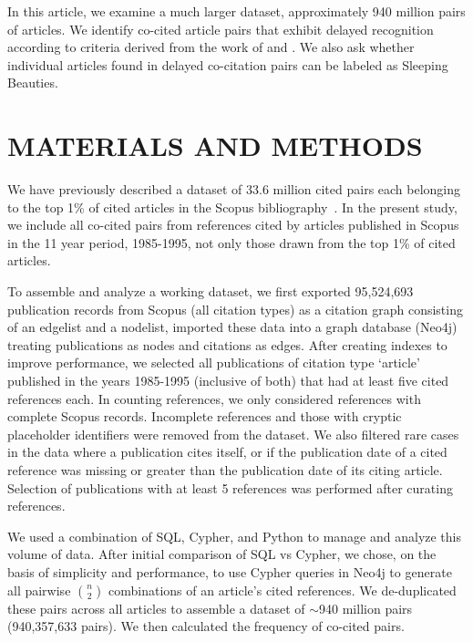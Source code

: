 \documentclass[utf8]{frontiersSCNS}
\begin{document}
In this article, we examine a much larger dataset, approximately 940 million pairs of articles. We identify co-cited article pairs that exhibit delayed recognition according to criteria derived from the work of  \cite{Raan2004,Raan2019} and  \cite{Ke2015}. We also ask whether individual articles found in delayed co-citation pairs can be labeled as Sleeping Beauties. 


\section{MATERIALS AND METHODS}

We have previously described a dataset of 33.6 million cited pairs each belonging to the top 1\% of cited articles in the Scopus bibliography~\citep[Figure~2]{devarakonda_2020}. In the present study, we include all co-cited pairs from references cited by articles published in Scopus in the 11 year period, 1985-1995, not only those drawn from the top 1\% of cited articles. 

To assemble and analyze a working dataset, we first exported 95,524,693 publication records from Scopus (all citation types) as a citation graph consisting of an edgelist and a nodelist, imported these data into a graph database (Neo4j) treating publications as nodes and citations as edges. After creating indexes to improve performance, we selected all publications of citation type `article' published in the years 1985-1995 (inclusive of both) that had at least five cited references each. In counting references, we only considered references with complete Scopus records. Incomplete references and those with cryptic placeholder identifiers were removed from the dataset. We also filtered rare cases in the data where a publication cites itself, or if the publication date of a cited reference was missing or greater than the publication date of its citing article. Selection of publications with at least 5 references was performed after curating references.

We used a combination of SQL, Cypher, and Python to manage and analyze this volume of data. After initial comparison of SQL vs Cypher, we chose, on the basis of simplicity and performance, to use Cypher queries in Neo4j to generate all pairwise $n\choose 2$ combinations of an article's cited references. We de-duplicated these pairs across all articles to assemble a dataset of $\sim$940 million pairs (940,357,633 pairs). We then calculated the frequency of co-cited pairs.  
\end{document}
